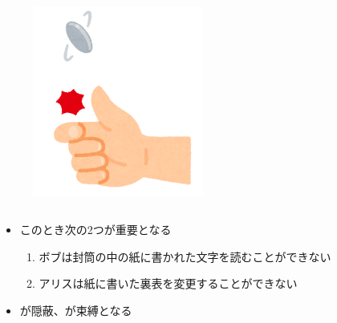 \begin{frame}
\begin{exampleblock}{}
\begin{columns}
\begin{column}{0.2\textwidth}
\begin{center}
\begin{figure}[h]
            \includegraphics[width=0.5\textwidth]{img/sports_coin_toss.png}
          \end{figure}
        \end{center}
      \end{column}
    \end{columns}
  \end{exampleblock}

  \begin{itemize}
    \item このとき次の2つが重要となる
    \begin{enumerate}
      \item \label{enum:hiding}
      ボブは封筒の中の紙に書かれた文字を読むことができない
      \item \label{enum:binding}
      アリスは紙に書いた裏表を変更することができない
    \end{enumerate}

    \item {}が隠蔽、が束縛となる
  \end{itemize}
\end{frame}

